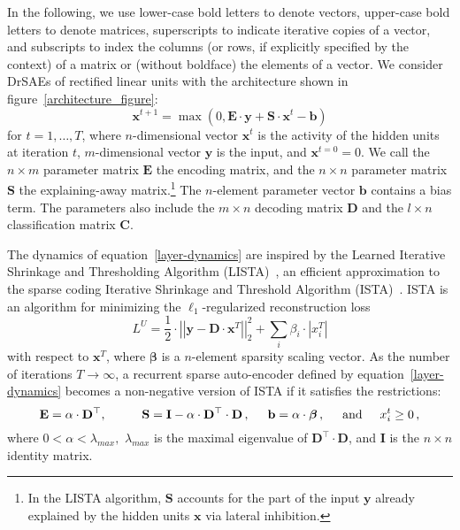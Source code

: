 \documentclass{article} %
\newcommand{\bv}{\mathbf{b}}
\newcommand{\x}{\mathbf{x}}
\newcommand{\y}{\mathbf{y}}
\newcommand{\C}{\mathbf{C}}
\newcommand{\D}{\mathbf{D}}
\newcommand{\E}{\mathbf{E}}
\newcommand{\I}{\mathbf{I}}
\newcommand{\Sm}{\mathbf{S}}
\begin{document}
In the following, we use lower-case bold letters to denote vectors, upper-case bold letters to denote matrices, superscripts to indicate iterative copies of a vector, and subscripts to index the columns (or rows, if explicitly specified by the context) of a matrix or (without boldface) the elements of a vector.
We consider %
DrSAEs of rectified linear units with the architecture shown in figure~\ref{architecture_figure}: %
\begin{equation} \label{layer-dynamics}
\x^{t+1} = \max\left(0, \E \cdot \y + \Sm \cdot \x^t - \bv \right)
\end{equation}
for $t = 1, \ldots, T$, where $n$-dimensional vector $\x^t$ is the activity of the hidden units at iteration $t$, %
$m$-dimensional vector $\y$ is the input, and $\x^{t=0} = 0$.  We call the $n \times m$ parameter matrix $\E$ the encoding matrix, and the $n \times n$ parameter matrix $\Sm$ the explaining-away matrix.\footnote{In the LISTA algorithm, $\Sm$ accounts for the part of the input $\y$ already explained by the hidden units $\x$ via lateral inhibition.}  The $n$-element parameter vector $\bv$ contains a bias term.  The parameters also include the $m \times n$ decoding matrix $\D$ and the $l \times n$ classification matrix $\C$.

The dynamics of equation~\ref{layer-dynamics} are inspired by the Learned Iterative Shrinkage and Thresholding Algorithm (LISTA)~\citep{gregor2010}, an efficient approximation to the sparse coding Iterative Shrinkage and Threshold Algorithm (ISTA)~\citep{daubechies2004}.
ISTA is an %
algorithm for minimizing the $\ell_1$-regularized reconstruction loss %
\begin{equation} \label{reconstruction-loss}
L^U = \frac{1}{2} \cdot \left| \left| \y - \D \cdot \x^T \right| \right|_2^2 + \sum_i \beta_i \cdot \left| x_i^T \right| 
\end{equation}
with respect to $\x^T$, where $\boldsymbol\beta$  is a $n$-element sparsity scaling vector.  
As the number of iterations $T \rightarrow \infty$, a recurrent sparse auto-encoder defined by equation~\ref{layer-dynamics} becomes a non-negative version of ISTA if it satisfies the restrictions:
\begin{equation} \label{ISTA-restriction}
\E = \alpha \cdot \D^{\top} , \hspace{1cm}
\Sm = \I - \alpha \cdot \D^{\top} \cdot \D \, , \hspace{0.5cm}
\bv= \alpha \cdot \boldsymbol\beta \, , \hspace{0.5cm}
\text{and} \hspace{0.5cm} x_i^t \geq 0 \, ,
\end{equation}
where $0 < \alpha < \lambda_{max},$ $\lambda_{max}$ is the maximal eigenvalue of $\D^{\top} \cdot \D$, and $\I$ is the $n \times n$ identity matrix.
\end{document}
